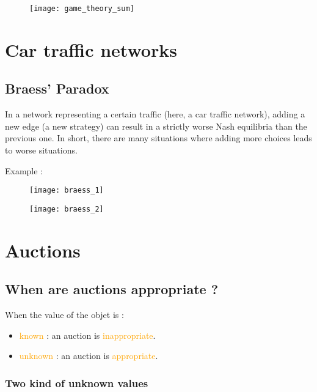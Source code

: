 \begin{figure}[H]
    \centering
    \texttt{[image: game\_theory\_sum]}
\end{figure}

\chapter{Car traffic networks}

\section{Braess' Paradox}

In a network representing a certain traffic (here, a car traffic network), adding a new edge (a new strategy) can result in a strictly worse Nash equilibria than the previous one.
In short, there are many situations where adding more choices leads to worse situations.

Example :

\begin{figure}[H]
    \centering
    \texttt{[image: braess\_1]}
\end{figure}

\begin{figure}[H]
    \centering
    \texttt{[image: braess\_2]}
\end{figure}

\chapter{Auctions}

\section{When are auctions appropriate ?}

When the value of the objet is :
\begin{itemize}
\item \textcolor{orange}{known} : an auction is \textcolor{orange}{inappropriate}.
\item \textcolor{orange}{unknown} : an auction is \textcolor{orange}{appropriate}.
\end{itemize}

\subsection{Two kind of unknown values}

